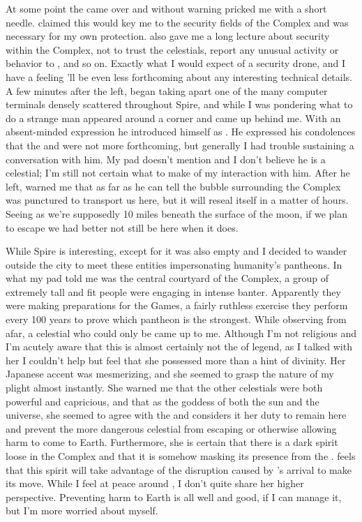 \documentclass[char]{guardians}
\begin{document}
At some point the \cWarden{} came over and without warning pricked me with a short needle. \cWarden{\They} claimed this would key me to the security fields of the Complex and was necessary for my own protection. \cWarden{\They} also gave me a long lecture about security within the Complex, not to trust the celestials, report any unusual activity or behavior to \cWarden{\them}, and so on. Exactly what I would expect of a security drone, and I have a feeling \cWarden{\they}'ll be even less forthcoming about any interesting technical details. A few minutes after the \cWarden{} left, \cUnity{} began taking apart one of the many computer terminals densely scattered throughout Spire, and while I was pondering what to do a strange man appeared around a corner and came up behind me. With an absent-minded expression he introduced himself as \cJascha{\intro}. He expressed his condolences that the \cCaretaker{} and \cWarden{} were not more forthcoming, but generally I had trouble sustaining a conversation with him. My pad doesn't mention \cJascha{} and I don't believe he is a celestial; I'm still not certain what to make of my interaction with him. After he left, \cUnity{} warned me that as far as he can tell the bubble surrounding the Complex was punctured to transport us here, but it will reseal itself in a matter of hours. Seeing as we're supposedly 10 miles beneath the surface of the moon, if we plan to escape we had better not still be here when it does.

While Spire is interesting, except for \cUnity{} it was also empty and I decided to wander outside the city to meet these entities impersonating humanity's pantheons. In what my pad told me was the central courtyard of the Complex, a group of extremely tall and fit people were engaging in intense banter. Apparently they were making preparations for the Games, a fairly ruthless exercise they perform every 100 years to prove which pantheon is the strongest. While observing from afar, a celestial who could only be \cAmaterasu{} came up to me. Although I'm not religious and I'm acutely aware that this is almost certainly not the \cAmaterasu{} of legend, as I talked with her I couldn't help but feel that she possessed more than a hint of divinity. Her Japanese accent was mesmerizing, and she seemed to grasp the nature of my plight almost instantly. She warned me that the other celestials were both powerful and capricious, and that as the goddess of both the sun and the universe, she seemed to agree with the \cWarden{} and considers it her duty to remain here and prevent the more dangerous celestial from escaping or otherwise allowing harm to come to Earth. Furthermore, she is certain that there is a dark spirit loose in the Complex and that it is somehow masking its presence from the \cWarden{}. \cAmaterasu{} feels that this spirit will take advantage of the disruption caused by \cUnity{}'s arrival to make its move. While I feel at peace around \cAmaterasu{}, I don't quite share her higher perspective. Preventing harm to Earth is all well and good, if I can manage it, but I'm more worried about myself.
                                                                                    
\end{document}
